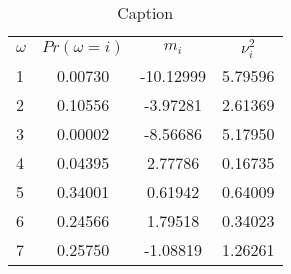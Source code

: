 \documentclass{article}
\begin{document}
\begin{table}
    \centering
    \begin{tabular}{lccc} 
          $\omega$ &$Pr(\omega = i)$&  $m_i$&  $\nu^2_i$\\ 
          1&0.00730  &  -10.12999&  5.79596\\ 
          2&0.10556  &   -3.97281 &  2.61369\\ 
          3&0.00002 &  -8.56686 &   5.17950\\ 
          4&0.04395 &  2.77786  &   0.16735 \\ 
          5&0.34001&   0.61942    &  0.64009\\ 
          6&0.24566 &  1.79518    &  0.34023 \\ 
          7&0.25750 &  -1.08819    &  1.26261\\ 
    \end{tabular}
    \caption{Caption}
    \label{tab:my_label}
\end{table}

\end{document}
